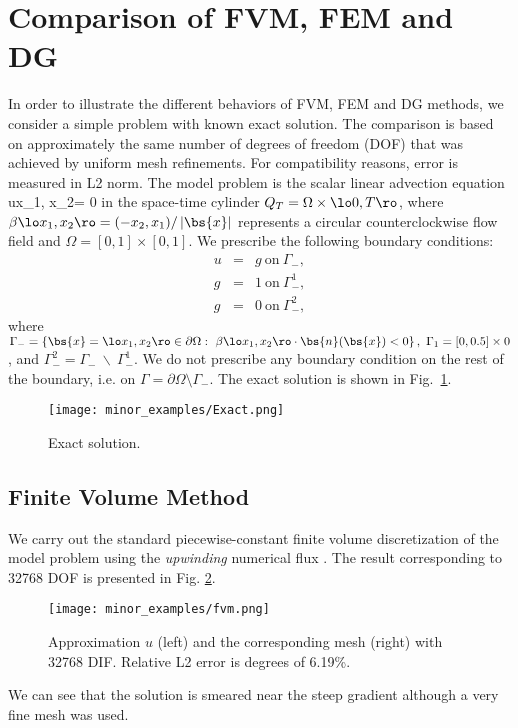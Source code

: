 \vspace{5mm}
\section{Comparison of FVM, FEM and DG}

In order to illustrate the different behaviors of FVM, FEM and DG methods, we consider a simple problem with known exact 
solution. The comparison is based on approximately the same number of degrees of freedom (DOF) that was achieved by uniform mesh 
refinements. For compatibility reasons, error is measured in L2 norm. The model problem is the scalar linear advection equation
\be
\label{ade}
\nabla \cdot \beta u\lo x_1, x_2\ro = 0
\ee
in the space-time cylinder $Q_T = \Omega \times \lo 0, T \ro$, where 
$\beta \lo x_1, x_2\ro = (-x_2, x_1) / \left|\bs{x}\right|$ represents a circular counterclockwise 
flow field and $\Omega = [0, 1] \times [0, 1]$. We prescribe the following boundary conditions:
\begin{eqnarray}
u & = & g\ \mbox{on}\ \Gamma_-,\\
g & = & 1\ \mbox{on}\ \Gamma_-^1,\\
g & = & 0\ \mbox{on}\ \Gamma_-^2,
\end{eqnarray}
where $\Gamma_- = \left\{\bs{x} = \lo x_1, x_2\ro\in\partial\Omega:\ \beta\lo x_1, x_2 \ro \cdot \bs{n}(\bs{x}) < 0\right\},\ \Gamma_1 = [0,0.5] \times {0}$, and $\Gamma_-^2 = \Gamma_-\ \backslash\ \Gamma_-^1$. We do not prescribe any boundary condition on the rest of the boundary, i.e. on $\Gamma = \partial\Omega \setminus \Gamma_-$. The exact solution is shown in Fig.~\ref{fig:Exact}.
\begin{figure}[H]
\label{fig:Exact}
\begin{center}
\texttt{[image: minor\_examples/Exact.png]}
\end{center}

\caption{Exact solution.}
\end{figure}
	
\subsection{Finite Volume Method}
We carry out the standard piecewise-constant finite volume discretization of the model problem using the \emph{upwinding} 
numerical flux \cite{compress}. The result corresponding to 32768 DOF is presented in Fig. \ref{fig:fvm000}.
\begin{figure}[H]
\begin{center}
\texttt{[image: minor\_examples/fvm.png]}
\label{fig:fvm000}
\end{center}

\caption{Approximation $u$ (left) and the corresponding mesh (right) with 32768 DIF. Relative L2 error is degrees of 6.19\%.}
\end{figure}
\noindent
We can see that the solution is smeared near the steep gradient although a very fine mesh was used. 
	
